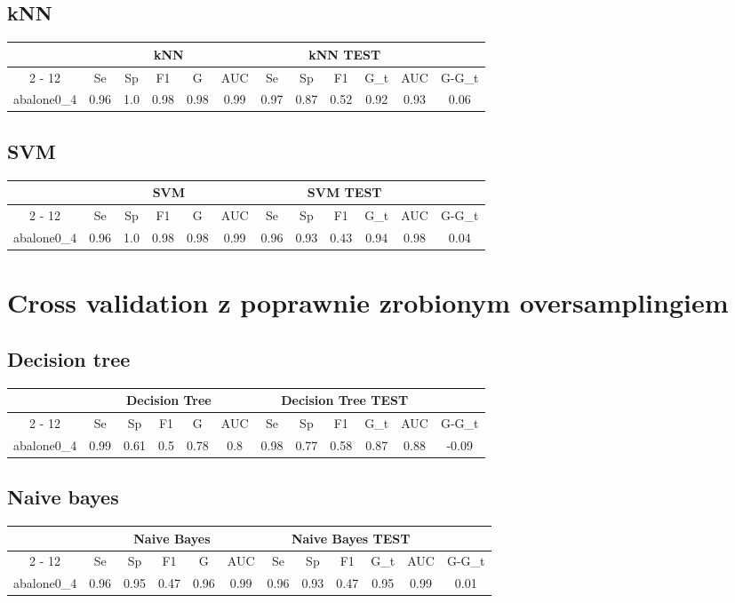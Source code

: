 \documentclass{article}%
\begin{document}
%
\subsection*{kNN}%
\begin{tabular}{|c|c|c|c|c|c|c|c|c|c|c|c|}%
\hline%
&\multicolumn{5}{|c|}{kNN}&\multicolumn{5}{|c|}{kNN TEST}&\\%
\cline{2%
-%
12}%
&Se&Sp&F1&G&AUC&Se&Sp&F1&G\_t&AUC&G{-}G\_t\\%
\hline%
abalone0\_4&0.96&1.0&0.98&0.98&0.99&0.97&0.87&0.52&0.92&0.93&0.06\\%
\hline%
\end{tabular}

%
\subsection*{SVM}%
\begin{tabular}{|c|c|c|c|c|c|c|c|c|c|c|c|}%
\hline%
&\multicolumn{5}{|c|}{SVM}&\multicolumn{5}{|c|}{SVM TEST}&\\%
\cline{2%
-%
12}%
&Se&Sp&F1&G&AUC&Se&Sp&F1&G\_t&AUC&G{-}G\_t\\%
\hline%
abalone0\_4&0.96&1.0&0.98&0.98&0.99&0.96&0.93&0.43&0.94&0.98&0.04\\%
\hline%
\end{tabular}

%
\section*{Cross validation z poprawnie zrobionym oversamplingiem}%
\subsection*{Decision tree}%
\begin{tabular}{|c|c|c|c|c|c|c|c|c|c|c|c|}%
\hline%
&\multicolumn{5}{|c|}{Decision Tree}&\multicolumn{5}{|c|}{Decision Tree TEST}&\\%
\cline{2%
-%
12}%
&Se&Sp&F1&G&AUC&Se&Sp&F1&G\_t&AUC&G{-}G\_t\\%
\hline%
abalone0\_4&0.99&0.61&0.5&0.78&0.8&0.98&0.77&0.58&0.87&0.88&{-}0.09\\%
\hline%
\end{tabular}

%
\subsection*{Naive bayes}%
\begin{tabular}{|c|c|c|c|c|c|c|c|c|c|c|c|}%
\hline%
&\multicolumn{5}{|c|}{Naive Bayes}&\multicolumn{5}{|c|}{Naive Bayes TEST}&\\%
\cline{2%
-%
12}%
&Se&Sp&F1&G&AUC&Se&Sp&F1&G\_t&AUC&G{-}G\_t\\%
\hline%
abalone0\_4&0.96&0.95&0.47&0.96&0.99&0.96&0.93&0.47&0.95&0.99&0.01\\%
\hline%
\end{tabular}
\end{document}
